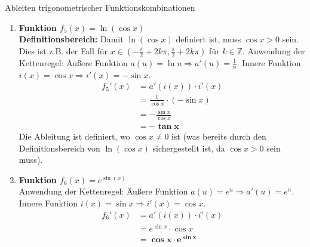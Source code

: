 \begin{loesungsumgebung}{Ableiten trigonometrischer Funktionskombinationen}
\begin{enumerate}[label=(\alph*)]
    \item \textbf{Funktion $f_5(x) = \ln(\cos x)$} \\
    \textbf{Definitionsbereich:} Damit $\ln(\cos x)$ definiert ist, muss $\cos x > 0$ sein. Dies ist z.B. der Fall für $x \in (-\frac{\pi}{2} + 2k\pi, \frac{\pi}{2} + 2k\pi)$ für $k \in \mathbb{Z}$.
    Anwendung der Kettenregel: Äußere Funktion $a(u) = \ln u \Rightarrow a'(u) = \frac{1}{u}$. Innere Funktion $i(x) = \cos x \Rightarrow i'(x) = -\sin x$.
    \begin{align*}
    f_5'(x) &= a'(i(x)) \cdot i'(x) \\
            &= \frac{1}{\cos x} \cdot (-\sin x) \\
            &= -\frac{\sin x}{\cos x} \\
            &= \mathbf{-\tan x}
    \end{align*}
    Die Ableitung ist definiert, wo $\cos x \neq 0$ ist (was bereits durch den Definitionsbereich von $\ln(\cos x)$ sichergestellt ist, da $\cos x > 0$ sein muss).

    \item \textbf{Funktion $f_6(x) = e^{\sin(x)}$} \\
    Anwendung der Kettenregel: Äußere Funktion $a(u) = e^u \Rightarrow a'(u) = e^u$. Innere Funktion $i(x) = \sin x \Rightarrow i'(x) = \cos x$.
    \begin{align*}
    f_6'(x) &= a'(i(x)) \cdot i'(x) \\
            &= e^{\sin x} \cdot \cos x \\
            &= \mathbf{\cos x \cdot e^{\sin x}}
    \end{align*}
\end{enumerate}

\end{loesungsumgebung}




